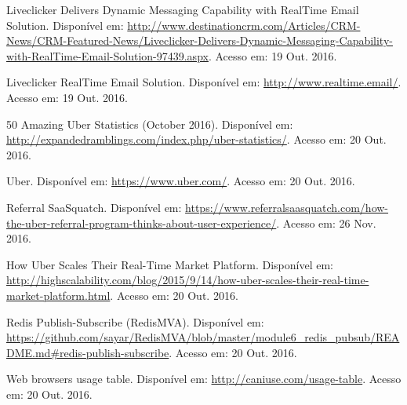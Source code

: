 \documentclass[brazil,ruledheader]{abntifes}
\begin{document}
	\tableofcontents{}
	
	
	
	
	
	
	
	
	
	
	
	
	\begin{thebibliography}{9}
		Liveclicker Delivers Dynamic Messaging Capability with RealTime Email Solution. Disponível em: \url{http://www.destinationcrm.com/Articles/CRM-News/CRM-Featured-News/Liveclicker-Delivers-Dynamic-Messaging-Capability-with-RealTime-Email-Solution-97439.aspx}.
		Acesso em: 19 Out. 2016.
		
		Liveclicker RealTime Email Solution. Disponível em: \url{http://www.realtime.email/}.
		Acesso em: 19 Out. 2016.
		
		50 Amazing Uber Statistics (October 2016). Disponível em: \url{http://expandedramblings.com/index.php/uber-statistics/}.
		Acesso em: 20 Out. 2016.
		
		Uber. Disponível em: \url{https://www.uber.com/}.
		Acesso em: 20 Out. 2016.
		
		Referral SaaSquatch. Disponível em: \url{https://www.referralsaasquatch.com/how-the-uber-referral-program-thinks-about-user-experience/}.
		Acesso em: 26 Nov. 2016.
		
		How Uber Scales Their Real-Time Market Platform. Disponível em: \url{http://highscalability.com/blog/2015/9/14/how-uber-scales-their-real-time-market-platform.html}.
		Acesso em: 20 Out. 2016.
		
		Redis Publish-Subscribe (RedisMVA). Disponível em: \url{https://github.com/sayar/RedisMVA/blob/master/module6_redis_pubsub/README.md#redis-publish-subscribe}.
		Acesso em: 20 Out. 2016.
		
		Web browsers usage table. Disponível em: \url{http://caniuse.com/usage-table}.
		Acesso em: 20 Out. 2016.
		

\end{thebibliography}
\end{document}
